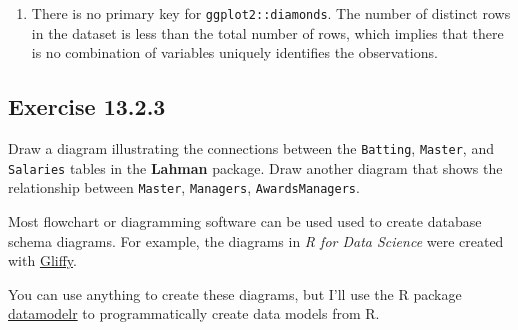 \documentclass[]{book}
\newenvironment{Shaded}{\begin{snugshade}}{\end{snugshade}}
\newcommand{\CommentTok}[1]{\textcolor[rgb]{0.56,0.35,0.01}{\textit{#1}}}
\newcommand{\DecValTok}[1]{\textcolor[rgb]{0.00,0.00,0.81}{#1}}
\newcommand{\KeywordTok}[1]{\textcolor[rgb]{0.13,0.29,0.53}{\textbf{#1}}}
\newcommand{\NormalTok}[1]{#1}
\newcommand{\OperatorTok}[1]{\textcolor[rgb]{0.81,0.36,0.00}{\textbf{#1}}}
\newcommand{\StringTok}[1]{\textcolor[rgb]{0.31,0.60,0.02}{#1}}
\theoremstyle{plain}
\theoremstyle{remark}
\theoremstyle{definition}
\theoremstyle{definition}
\theoremstyle{definition}
\theoremstyle{remark}
\begin{document}
\begin{enumerate}
\begin{Shaded}
\end{Shaded}
\item
  There is no primary key for \texttt{ggplot2::diamonds}. The number of
  distinct rows in the dataset is less than the total number of rows,
  which implies that there is no combination of variables uniquely
  identifies the observations.

\begin{Shaded}
\end{Shaded}
\end{enumerate}

\hypertarget{exercise-13.2.3}{%
\subsection*{\texorpdfstring{Exercise
{13.2.3}}{Exercise 13.2.3}}\label{exercise-13.2.3}}

Draw a diagram illustrating the connections between the
\texttt{Batting}, \texttt{Master}, and \texttt{Salaries} tables in the
\textbf{Lahman} package. Draw another diagram that shows the
relationship between \texttt{Master}, \texttt{Managers},
\texttt{AwardsManagers}.

Most flowchart or diagramming software can be used used to create
database schema diagrams. For example, the diagrams in \emph{R for Data
Science} were created with \href{https://www.gliffy.com/}{Gliffy}.

You can use anything to create these diagrams, but I'll use the R
package \href{https://github.com/bergant/datamodelr}{datamodelr} to
programmatically create data models from R.
\end{document}
